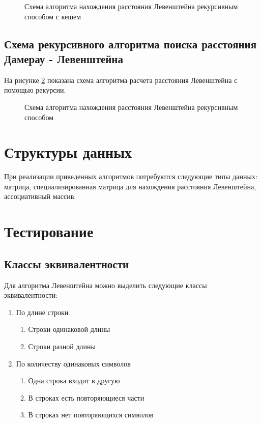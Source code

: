 \begin{figure}[H]
    \caption{Схема алгоритма нахождения расстояния Левенштейна рекурсивным способом с кешем}
    \label{ris:levenshteinrecursivekeshschema}
\end{figure}

\subsection{Схема рекурсивного алгоритма поиска расстояния Дамерау - Левенштейна}\label{SchemaRecursDamerayLeventshein}

На рисунке \ref{ris:levenshteinDamerayrecursiveschema} показана схема алгоритма расчета расстояния Левенштейна с помощью рекурсии.

\begin{figure}[H]
    \caption{Схема алгоритма нахождения расстояния Левенштейна рекурсивным способом}
    \label{ris:levenshteinDamerayrecursiveschema}
\end{figure}

\section{Структуры данных}\label{Structs}

При реализации приведенных алгоритмов потребуются следующие типы данных: матрица, 
специализированная матрица для нахождения расстояния Левенштейна, ассоциативный массив.

\section{Тестирование}\label{Testing}

\subsection{Классы эквивалентности}\label{TestingClasses}

Для алгоритма Левенштейна можно выделить следующие классы эквивалентности:

\begin{enumerate}
    \item По длине строки
    \begin{enumerate}
        \item Строки одинаковой длины
        \item Строки разной длины
    \end{enumerate} 
    \item По количеству одинаковых символов
    \begin{enumerate}
        \item Одна строка входит в другую
        \item В строках есть повторяющиеся части
        \item В строках нет повторяющихся символов
    \end{enumerate} 
\end{enumerate}

